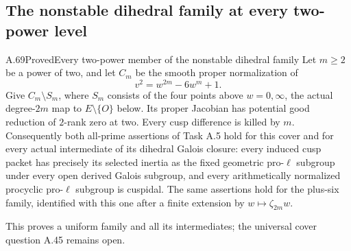 \subsection{The nonstable dihedral family at every two-power level}

\begin{statement}{A.69}{Proved}{Every two-power member of the nonstable dihedral family}
Let \(m\ge2\) be a power of two, and let \(C_m\) be the smooth proper
normalization of
\[
                    v^2=w^{2m}-6w^m+1.
\]
Give \(C_m\setminus S_m\), where \(S_m\) consists of the four points
above \(w=0,\infty\), the actual degree-\(2m\) map to
\(E\setminus\{O\}\) below. Its proper Jacobian has potential good
reduction of \(2\)-rank zero at two. Every cusp difference is killed
by \(m\). Consequently both all-prime assertions of Task A.5 hold
for this cover and for every actual intermediate of its dihedral
Galois closure: every induced cusp packet has precisely its selected
inertia as the fixed geometric pro-\(\ell\) subgroup under every
open derived Galois subgroup, and every arithmetically normalized
procyclic pro-\(\ell\) subgroup is cuspidal. The same assertions hold
for the plus-six family, identified with this one after a finite
extension by \(w\mapsto\zeta_{2m}w\).

This proves a uniform family and all its intermediates; the universal
cover question A.45 remains open.
\end{statement}

